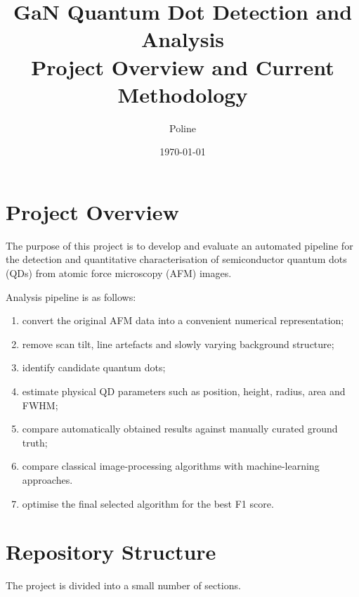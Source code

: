 \documentclass[11pt,a4paper]{article}
\title{
    \textbf{GaN Quantum Dot Detection and Analysis}\\
    \large Project Overview and Current Methodology
}
\author{Poline}
\date{\today}
\begin{document}
\maketitle
\tableofcontents
\newpage


\section{Project Overview}

The purpose of this project is to develop and evaluate an automated pipeline for the detection and quantitative characterisation of semiconductor quantum dots (QDs) from atomic force microscopy (AFM) images.

Analysis pipeline is as follows:

\begin{enumerate}[itemsep=2pt]
    \item convert the original AFM data into a convenient numerical representation;
    \item remove scan tilt, line artefacts and slowly varying background structure;
    \item identify candidate quantum dots;
    \item estimate physical QD parameters such as position, height, radius, area and FWHM;
    \item compare automatically obtained results against manually curated ground truth;
    \item compare classical image-processing algorithms with machine-learning approaches.
    \item optimise the final selected algorithm for the best F1 score.
\end{enumerate}


\section{Repository Structure}

The project is divided into a small number of sections.
\end{document}
